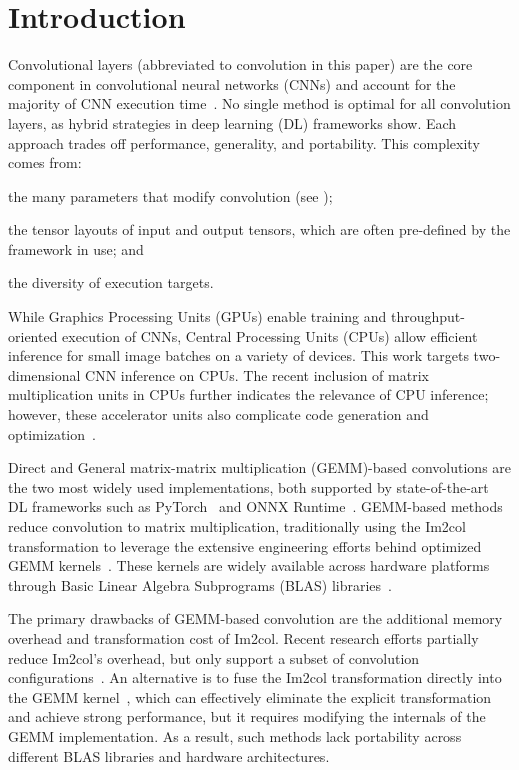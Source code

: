 \section{Introduction}

Convolutional layers (abbreviated to convolution in this paper) are the core component in convolutional neural networks (CNNs) and account for the majority of CNN execution time~\cite{LeCun1989}.
No single method is optimal for all convolution layers, as hybrid strategies in deep learning (DL) frameworks show.
Each approach trades off performance, generality, and portability.
This complexity comes from:
\begin{enumerate*}[label=(\roman*)] 
    \item the many parameters that modify convolution (see ); 
    \item the tensor layouts of input and output tensors, which are often pre-defined by the framework in use; and
    \item the diversity of execution targets.
\end{enumerate*}
While Graphics Processing Units (GPUs) enable training and throughput-oriented execution of CNNs, Central Processing Units (CPUs) allow efficient inference for small image batches on a variety of devices.
This work targets two-dimensional CNN inference on CPUs.
The recent inclusion of matrix multiplication units in CPUs further indicates the relevance of CPU inference; however, these accelerator units also complicate code generation and optimization~\cite{Carvalho2022,tpu2017,nvidia2021}.

Direct and General matrix-matrix multiplication (GEMM)-based convolutions are the two most widely used implementations, both supported by state-of-the-art DL frameworks such as PyTorch~\cite{pytorch2024} and ONNX Runtime~\cite{onnxruntime}.
GEMM-based methods reduce convolution to matrix multiplication, traditionally using the Im2col transformation to leverage the extensive engineering efforts behind optimized GEMM kernels~\cite{chellapilla2006}.
These kernels are widely available across hardware platforms through Basic Linear Algebra Subprograms (BLAS) libraries~\cite{blis2015,openblas2013,Goto2008}.

The primary drawbacks of GEMM-based convolution are the additional memory overhead and transformation cost of Im2col.
Recent research efforts partially reduce Im2col's overhead, but only support a subset of convolution configurations~\cite{Cho2017,Ofir2022,Anderson2020,Korostelev2023}.
An alternative is to fuse the Im2col transformation directly into the GEMM kernel~\cite{Wang2019,Dukhan2019,Juan2020,Zhao2023}, which can effectively eliminate the explicit transformation and achieve strong performance, but it requires modifying the internals of the GEMM implementation.
As a result, such methods lack portability across different BLAS libraries and hardware architectures.

